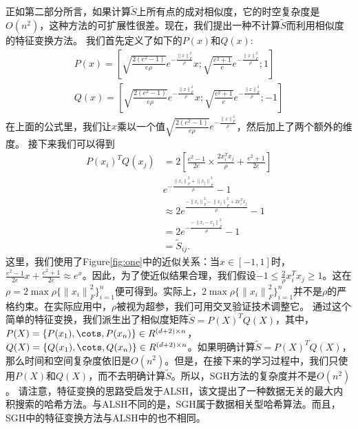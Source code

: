 \documentclass{article}
\begin{document}
正如第二部分所言，如果计算$\tilde{S}$上所有点的成对相似度，它的时空复杂度是$O(n^2)$，这种方法的可扩展性很差。现在，我们提出一种不计算$\tilde{S}$而利用相似度的特征变换方法。
我们首先定义了如下的$P(x)$和$Q(x)$:
\begin{equation}
\begin{split}
P(x)=[\sqrt{\frac{2(e^2-1)}{e\rho}}e^{-\frac{{\|x\|}^2_F}{\rho}}x;\sqrt{\frac{e^2+1}{e}}e^{-\frac{{\|x\|}^2_F}{\rho}};1]\\
Q(x)=[\sqrt{\frac{2(e^2-1)}{e\rho}}e^{-\frac{{\|x\|}^2_F}{\rho}}x;\sqrt{\frac{e^2+1}{e}}e^{-\frac{{\|x\|}^2_F}{\rho}};-1]
\end{split}
\end{equation}
在上面的公式里，我们让$x$乘以一个值$\sqrt{\frac{2(e^2-1)}{e\rho}}e^{-\frac{{\|x\|}^2_F}{\rho}}$，然后加上了两个额外的维度。
接下来我们可以得到
\begin{equation*}
\begin{split}
P(x_i)^TQ(x_j)&=2[\frac{e^2-1}{2e}\times \frac{2x^T_ix_j}{\rho}+\frac{e^2+1}{2e}]\\
&e^{-\frac{{\|x_i\|}^2_F+{\|x_j\|}^2_F}{\rho}}-1\\
&\approx 2e^{\frac{-{\|x_i\|}^2_F-{\|x_j\|}^2_F+2x^T_ix_j}{\rho}}-1\\
&=  2e^{-\frac{-{\|x_i-x_j\|}^2_F}{\rho}}-1\\
&= \tilde{S}_{ij}.
\end{split}
\end{equation*}
这里，我们使用了Figure\ref{fig:one}中的近似关系：当$x\in [-1,1]$时，$\frac{e^2-1}{2e}x+\frac{e^2+1}{2e}\approx e^x$。因此，为了使近似结果合理，我们假设$-1\leq \frac{2}{\rho}x^T_ix_j \geq 1$。这在$\rho = 2\max\rho\{{\|x_i\|}^2_F\}^n_{i=1}$便可得到。实际上，$2\max\rho\{{\|x_i\|}^2_F\}^n_{i=1}$并不是$\rho$的严格约束。在实际应用中，$\rho$被视为超参，我们可用交叉验证技术调整它。
通过这个简单的特征变换，我们派生出了相似度矩阵$\tilde{S} = P(X)^TQ(X)$，其中，$P(X)=\{P(x_1),\cots,P(x_n)\}\in R^{(d+2)\times n}$， $Q(X)=\{Q(x_1),\cots,Q(x_n)\}\in R^{(d+2)\times n}$。如果明确计算$\tilde{S} = P(X)^TQ(X)$，那么时间和空间复杂度依旧是$O(n^2)$。但是，在接下来的学习过程中，我们只使用$P(X)$和$Q(X)$，而不去明确计算$\tilde{S}$。所以，SGH方法的复杂度并不是$O(n^2)$。
请注意，特征变换的思路受启发于ALSH\cite{NIPS2014_5329}，该文提出了一种数据无关的最大内积搜索的哈希方法。与ALSH不同的是，SGH属于数据相关型哈希算法。而且，SGH中的特征变换方法与ALSH中的也不相同。
\end{document}
